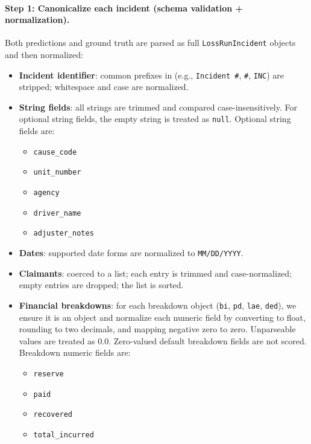 \paragraph{Step 1: Canonicalize each incident (schema validation + normalization).}
Both predictions and ground truth are parsed as full \texttt{LossRunIncident} objects and then normalized:
\begin{itemize}
    \item \textbf{Incident identifier}: common prefixes in  (e.g., \texttt{Incident \#}, \texttt{\#}, \texttt{INC}) are stripped; whitespace and case are normalized.
    \item \textbf{String fields}: all strings are trimmed and compared case-insensitively. For optional string fields, the empty string is treated as \texttt{null}. Optional string fields are:
    \begin{itemize}
        \item \texttt{cause\_code}
        \item \texttt{unit\_number}
        \item \texttt{agency}
        \item \texttt{driver\_name}
        \item \texttt{adjuster\_notes}
    \end{itemize}
    \item \textbf{Dates}: supported date forms are normalized to \texttt{MM/DD/YYYY}.
    \item \textbf{Claimants}: coerced to a list; each entry is trimmed and case-normalized; empty entries are dropped; the list is sorted.
    \item \textbf{Financial breakdowns}: for each breakdown object (\texttt{bi}, \texttt{pd}, \texttt{lae}, \texttt{ded}), we ensure it is an object and normalize each numeric field by converting to float, rounding to two decimals, and mapping negative zero to zero. Unparseable values are treated as 0.0. Zero-valued default breakdown fields are not scored. Breakdown numeric fields are:
    \begin{itemize}
        \item \texttt{reserve}
        \item \texttt{paid}
        \item \texttt{recovered}
        \item \texttt{total\_incurred}
    \end{itemize}
\end{itemize}

